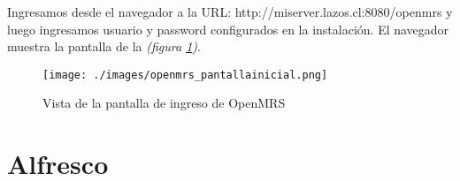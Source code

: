 Ingresamos desde el navegador a la URL: http://miserver.lazos.cl:8080/openmrs y luego ingresamos usuario y password configurados en la instalación. El navegador muestra la pantalla de la \emph{(figura \ref{fig:pantallainicialopenmrs})}.

\begin{figure}
 \centering
 \texttt{[image: ./images/openmrs\_pantallainicial.png]}
 \caption{Vista de la pantalla de ingreso de OpenMRS}
 \label{fig:pantallainicialopenmrs}
\end{figure}

\section{Alfresco}


